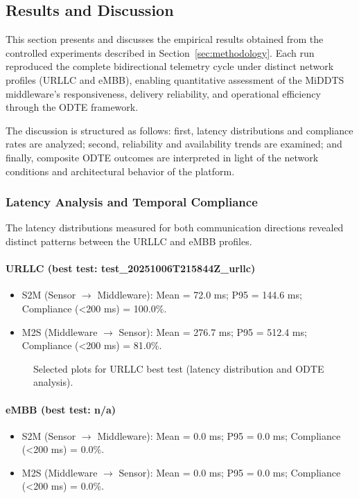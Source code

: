 \subsection{Results and Discussion}

This section presents and discusses the empirical results obtained from the controlled experiments described in Section~\ref{sec:methodology}. Each run reproduced the complete bidirectional telemetry cycle under distinct network profiles (URLLC and eMBB), enabling quantitative assessment of the MiDDTS middleware's responsiveness, delivery reliability, and operational efficiency through the ODTE framework.

The discussion is structured as follows: first, latency distributions and compliance rates are analyzed; second, reliability and availability trends are examined; and finally, composite ODTE outcomes are interpreted in light of the network conditions and architectural behavior of the platform.

\subsubsection{Latency Analysis and Temporal Compliance}

The latency distributions measured for both communication directions revealed distinct patterns between the URLLC and eMBB profiles.

\paragraph{URLLC (best test: test_20251006T215844Z_urllc)}
\begin{itemize}
  \item S2M (Sensor $\rightarrow$ Middleware): Mean = 72.0 ms; P95 = 144.6 ms; Compliance (<200 ms) = 100.0\%.
  \item M2S (Middleware $\rightarrow$ Sensor): Mean = 276.7 ms; P95 = 512.4 ms; Compliance (<200 ms) = 81.0\%.
\end{itemize}

\begin{figure}[ht]
  \centering
  
  \caption{Selected plots for URLLC best test (latency distribution and ODTE analysis).}
\end{figure}

\paragraph{eMBB (best test: n/a)}
\begin{itemize}
  \item S2M (Sensor $\rightarrow$ Middleware): Mean = 0.0 ms; P95 = 0.0 ms; Compliance (<200 ms) = 0.0\%.
  \item M2S (Middleware $\rightarrow$ Sensor): Mean = 0.0 ms; P95 = 0.0 ms; Compliance (<200 ms) = 0.0\%.
\end{itemize}

